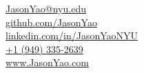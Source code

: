 \documentclass[]{two-column-resume}
\begin{document}
{
\large  %
{}
	\faEnvelope \hspace{0.1cm} \href{mailto:JasonYao@nyu.edu}{JasonYao@nyu.edu}\\
	\faGithub \hspace{0.1cm} \href{https://github.com/JasonYao}{github.com/JasonYao}\\
	\faLinkedinSquare \hspace{0.1cm} \href{https://www.linkedin.com/in/JasonYaoNYU/}{linkedin.com/in/JasonYaoNYU}\\
    \faPhone \hspace{0.1cm} \href{tel:19493352639}{+1 (949) 335-2639} \\
    \faGlobe \hspace{0.1cm} \href{https://www.JasonYao.com}{www.JasonYao.com}
}
\end{document}
